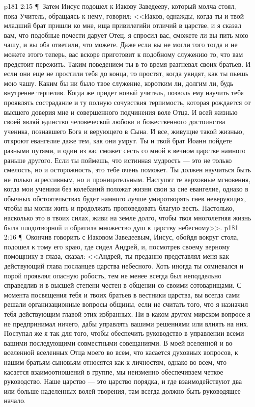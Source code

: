 \vs p181 2:15 \P\ Затем Иисус подошел к Иакову Заведееву, который молча стоял, пока Учитель, обращаясь к нему, говорил: <<Иаков, однажды, когда ты и твой младший брат пришли ко мне, ища привилегийи отличий в царстве, и я сказал вам, что подобные почести дарует Отец, я спросил вас, сможете ли вы пить мою чашу, и вы оба ответили, что можете. Даже если вы не могли того тогда и не можете этого теперь, вас вскоре приготовит к подобному служению то, что вам предстоит пережить. Таким поведением ты в то время разгневал своих братьев. И если они еще не простили тебя до конца, то простят, когда увидят, как ты пьешь мою чашу. Каким бы ни было твое служение, коротким ли, долгим ли, будь внутренне терпелив. Когда же придет новый учитель, позволь ему научить тебя проявлять сострадание и ту полную сочувствия терпимость, которая рождается от высшего доверия мне и совершенного подчинения воле Отца. И всей жизнью своей являй единство человеческой любови и божественного достоинства ученика, познавшего Бога и верующего в Сына. И все, живущие такой жизнью, откроют евангелие даже тем, как они умрут. Ты и твой брат Иоанн пойдете разными путями, и один из вас сможет сесть со мной в вечном царстве намного раньше другого. Если ты поймешь, что истинная мудрость --- это не только смелость, но и осторожность, это тебе очень поможет. Ты должен научиться быть не только агрессивным, но и проницательным. Наступят те верховные мгновения, когда мои ученики без колебаний положат жизни свои за сие евангелие, однако в обычных обстоятельствах будет намного лучше умиротворять гнев неверующих, чтобы вы могли жить и продолжать проповедовать благую весть. Настолько, насколько это в твоих силах, живи на земле долго, чтобы твоя многолетняя жизнь была плодотворной и обратила множество душ к царству небесному>>.
\vs p181 2:16 \P\ Окончив говорить с Иаковом Заведеевым, Иисус, обойдя вокруг стола, подошел к тому его краю, где сидел Андрей, и, посмотрев своему верному помощнику в глаза, сказал: <<Андрей, ты преданно представлял меня как действующий глава посланцев царства небесного. Хоть иногда ты сомневался и порой проявлял опасную робость, тем не менее всегда был неподдельно справедлив и в высшей степени честен в общении со своими сотоварищами. С момента посвящения тебя и твоих братьев в вестники царства, вы всегда сами решали организационные вопросы общины, если не считать того, что я назначил тебя действующим главой этих избранных. Ни в каком другом мирском вопросе я не предпринимал ничего, дабы управлять вашими решениями или влиять на них. Поступал же я так для того, чтобы обеспечить руководство в управлении всеми вашими последующими совместными совещаниями. В моей вселенной и во вселенной вселенных Отца моего во всем, что касается духовных вопросов, к нашим братьям\hyp{}сыновьям относятся как к личностям, однако во всем, что касается взаимоотношений в группе, мы неизменно обеспечиваем четкое руководство. Наше царство --- это царство порядка, и где взаимодействуют два или больше наделенных волей творения, там всегда должно быть руководящее начало.
